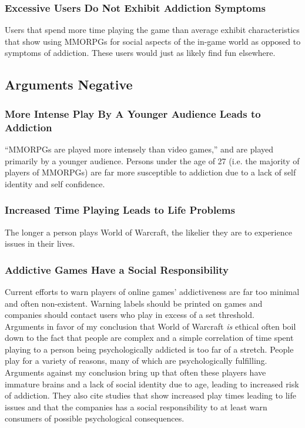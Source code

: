 \documentclass[11pt]{article}
\begin{document}
\begin{multicols}{2}
\subsubsection{Excessive Users Do Not Exhibit Addiction Symptoms}
Users that spend more time playing the game than average exhibit characteristics that show using MMORPGs for social aspects of the in-game world as opposed to symptoms of addiction. These users would just as likely find fun elsewhere. \cite{ExcessiveUseForSocialAspects}
\subsection{Arguments Negative}
\subsubsection{More Intense Play By A Younger Audience Leads to Addiction}
``MMORPGs are played more intensely than video games,'' and are played primarily by a younger audience. Persons under the age of 27 (i.e. the majority of players of MMORPGs) are far more susceptible to addiction due to a lack of self identity and self confidence. \cite{YoungerAudiencesGetAddicted}
\subsubsection{Increased Time Playing Leads to Life Problems}
The longer a person plays World of Warcraft, the likelier they are to experience issues in their lives. \cite{ProblemUsageAmongHighlyEngagedPlayers}
\subsubsection{Addictive Games Have a Social Responsibility}
Current efforts to warn players of online games' addictiveness are far too minimal and often non-existent. Warning labels should be printed on games and companies should contact users who play in excess of a set threshold. \cite{MMORPGSocialResponsibility}\\

Arguments in favor of my conclusion that World of Warcraft \emph{is} ethical often boil down to the fact that people are complex and a simple correlation of time spent playing to a person being psychologically addicted is too far of a stretch. People play for a variety of reasons, many of which are psychologically fulfilling. Arguments against my conclusion bring up that often these players have immature brains and a lack of social identity due to age, leading to increased risk of addiction. They also cite studies that show increased play times leading to life issues and that the companies has a social responsibility to at least warn consumers of possible psychological consequences.


\end{multicols}
\end{document}
